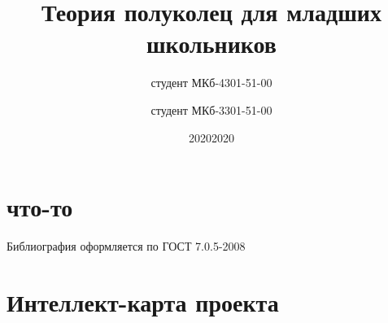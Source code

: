 \documentclass[14pt,Coursework]{diplomwork}
\date{2020}
\author{студент МКб-4301-51-00}{Фамилых Имярек Батькович}
\title{Теория полуколец для младших школьников}
\date{2020}
\author{студент МКб-3301-51-00}{%
Ботова Валерия Вячеславовна
}
\institute{математики и информационных систем}
\newcommand{\alert}[1]{{\color{red}#1}}
\begin{document}
\maketitle
\newpage

\tableofcontents


\chapter{что-то }
\begin{thebibliography}{99}
{} \alert{Библиография оформляется по ГОСТ 7.0.5-2008} 

\end{thebibliography}

\APPENDIX
\chapter{Интеллект-карта проекта}
\end{document}
